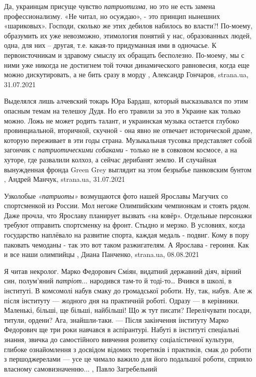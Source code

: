 Да, украинцам присуще чувство \emph{патриотизма}, но это не есть замена
профессионализму. «Не читал, но осуждаю», - это принцип нынешних «шариковых».
Господи, сколько же этих дебилов набилось во власти?! По-моему, образумить их
уже невозможно, этимология понятий у нас, образованных людей, одна, для них –
другая, т.е. какая-то придуманная ими в одночасье.  К первоисточникам и
здравому смыслу их обращать бесполезно. По-моему, мы с ними уже никогда не
достигнем той точки динамического равновесия, когда еще можно дискутировать, а
не бить сразу в морду
, 
Александр Гончаров, strana.ua, 31.07.2021

Выделялся лишь алчевский токарь Юра Бардаш, который высказывался по этим
опасным темам на телешоу Дудя. Но его травили за это в Украине как только
можно.  Ложь не может родить талант, и украинская музыка остается глубоко
провинциальной, вторичной, скучной - она явно не отвечает исторической драме,
которую переживает в эти годы страна. Музыкальная тусовка представляет собой
загончик с \emph{патриотическими собаками} - только не в совковом космосе, а на
хуторе, где развалили колхоз, а сейчас дерибанят землю.  И случайная
вынужденная фронда Green Grey выглядит на этом безрыбье панковским бунтом
, 
Андрей Манчук, strana.ua, 31.07.2021

Узколобые \emph{«патриоты»} возмущаются фото нашей Ярославы Магучих со
спортсменкой из России. Мол негоже Олимпийским чемпионкам и стоять рядом.  Даже
прочла, что Ярославу планирует вызвать «на ковёр». Отдельные персонажи требуют
отправить спортсменку на фронт.  Стыдно и мерзко. В условиях, когда государство
наплёвало на развитие спорта, каждая медаль - подвиг.  Кому в пору паковать
чемоданы - так это вот таком разжигателям.  А Ярослава - героиня. Как и все
наши олимпийцы
, 
Диана Панченко, strana.ua, 08.08.2021

Я читав некролог. Марко Федорович Сміян, видатний державний діяч, вірний син,
полум’яний \emph{патріот}... народився там-то й тоді-то… Вчився в школі, в інституті. В
комсомолі набув смаку до громадської роботи. Ну, так, набув. Але ж після
інституту — жодного дня на практичній роботі. Одразу — в керівники. Маленькі,
більші, ще більші, найбільші! Що ж тут писати? Перелічувати посади, титули,
ордени? Ага, знайшли-таки. — Після закінчення інституту Марко Федорович ще три
роки навчався в аспірантурі. Набуті в інституті спеціальні знання, звичка до
самостійного вивчення розвитку соціалістичної культури, глибоке ознайомлення з
досвідом відомих теоретиків і практиків, смак до роботи з першоджерелами — усе
це чимало важило для його подальшої роботи, сприяло власному самовизначенню...
, Павло Загребельний 
